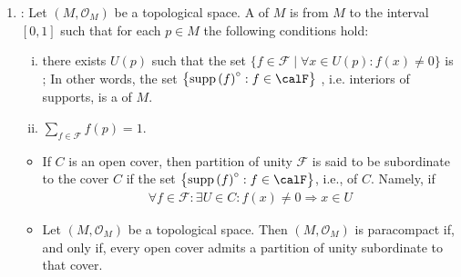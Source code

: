\documentclass{article}
\begin{document}
\begin{enumerate}
\begin{enumerate}
\begin{itemize}
        \end{itemize}
    \item    {}:  Let $\left(M, \mathcal{O}_{M}\right)$ be a topological space. A  of $M$ is from $M$ to the interval $[0,1]$ such that for each $p \in M$ the following conditions hold:
    \begin{enumerate}[i).]
        \item there exists $U(p)$ such that the set $\{f \in \mathcal{F} \mid \forall x \in U(p): f(x) \neq 0\}$ is ; In other words, the set $\left\{\operatorname{supp}\left(f\right)^{\circ}: f \in \calF \right\}$ , i.e. interiors of supports, is a  of $M$.
        \item $\sum_{f \in \mathcal{F}} f(p)=1$.
    \end{enumerate}
    \begin{itemize}
        \item {} If $C$ is an open cover, then partition of unity $\mathcal{F}$ is said to be subordinate to the cover $C$ if the set $\left\{\operatorname{supp}\left(f\right)^{\circ}: f \in \calF \right\}$, i.e.,  of $C$. Namely, if
\begin{align*}
\forall f \in \mathcal{F}: \exists U \in C: f(x) \neq 0 \Rightarrow x \in U
\end{align*}
\item Let $\left(M, \mathcal{O}_{M}\right)$ be a  topological space. Then $\left(M, \mathcal{O}_{M}\right)$ is paracompact if, and only if, every open cover admits a partition of unity subordinate to that cover. 
    \end{itemize}
     

\end{enumerate}
\end{enumerate}
\end{document}
